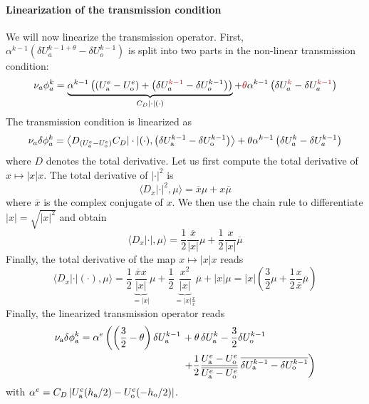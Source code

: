 \paragraph{Linearization of the transmission condition}
We will now linearize the transmission operator.
First, $\alpha^{k-1} \left(\delta U_a^{k-1+\theta}
- \delta U_o^{k-1}\right)$
is split into two parts in the non-linear transmission condition:
\begin{equation}
	\nu_a \phi_a^k =
	\underbrace{
	\alpha^{k-1} \left(\left(U^e_{\rm a} - U^e_{\rm o}\right) +
	\left(\delta U_a^{\emphase{k-1}}
	- \delta U_o^{k-1}\right)\right)}_{C_D|\cdot|(\cdot)}
	+ \emphase{\theta} \alpha^{k-1}
	\left(\delta U_a^{\emphase{k}} - \delta U_a^{\emphase{k-1}}
	\right)
\end{equation}
The transmission condition is linearized as
\begin{equation}
	\nu_a \delta \phi_a^k = \left\langle
	D_{\left(U_{\rm a}^e - U_{\rm o}^e\right)}
	C_D |\cdot|(\cdot),
	\left(\delta U_{\rm a}^{k-1} -
	\delta U_{\rm o}^{k-1}
	\right)
	\right\rangle
	+ \theta \alpha^{k-1}
	\left(\delta U_a^{k} - \delta U_a^{k-1}
	\right)
\end{equation}
where $D$ denotes the total derivative.
Let us first compute the total derivative of $x\mapsto |x|x$.
The total derivative of $|\cdot|^2$ is
\begin{equation}
\langle D_x |\cdot|^2, \mu \rangle
= \overline{x} \mu + x \overline{\mu}
\end{equation}
where $\overline{x}$ is the complex conjugate of $x$.
We then use the chain rule to differentiate $|x| = \sqrt{|x|^2}$ and
obtain
\begin{equation}
\langle D_x |\cdot|, \mu \rangle =
\frac{1}{2} \frac{\overline{x}}{|x|} \mu
+ \frac{1}{2} \frac{x}{|x|} \overline{\mu}
\end{equation}
Finally, the total derivative of the map $x\mapsto |x|x$ reads
\begin{equation}
	\langle D_x |\cdot|(\cdot), \mu \rangle =
	\frac{1}{2} \underbrace{\frac{\overline{x}x}{|x|}}_{=|x|} \mu
	+ \frac{1}{2}
	\underbrace{\frac{x^2}{|x|}}_{=|x|\frac{x}{\overline{x}}}
	\overline{\mu}
	+ |x|\mu
	= |x| \left(\frac{3}{2}\mu + \frac{1}{2}\frac{x}{\overline{x}}
	\overline{\mu}\right)
\end{equation}
Finally, the linearized transmission operator reads
\begin{equation}
\label{eq:linearised}
\begin{aligned}
\nu_{\rm a}\delta\phi_{\rm a}^k = \alpha^e 
\left( \left(\frac{3}{2} - \theta \right)\delta U_{\rm a}^{k-1} \right.
&+ \theta\, \delta U_{\rm a}^{k}
- \frac{3}{2} \delta U_{\rm o}^{k-1}
\\
&\left.+ \frac{1}{2}\frac{U_{\rm a}^{{\color{black} e}} - U_{\rm o}^{{\color{black} e}}}
	{\overline{U_{\rm a}^{{\color{black} e}} - U_{\rm o}^{{\color{black} e}}}}\,
\overline{
\delta U_{\rm a}^{k-1} - \delta U_{\rm o}^{k-1}}
\right)
\end{aligned}
\end{equation}
with $\alpha^e=C_D\left|U_{\rm a}^e(h_{\rm a}/2) - U_{\rm o}^e(-h_{\rm o}/2)\right|$.
